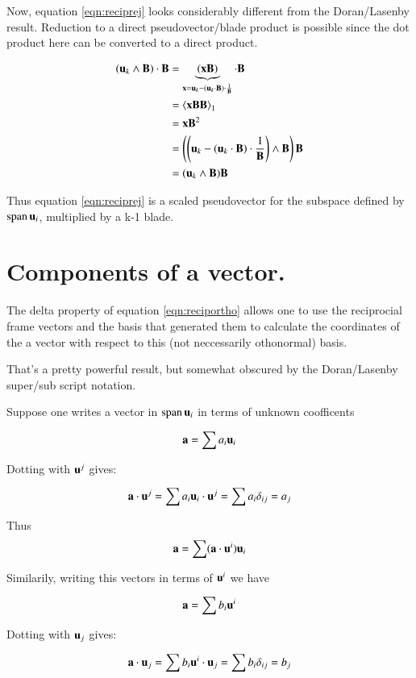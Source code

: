 \documentclass{article}      %
\newcommand{\gpgradeone}[1] {{\left\langle{{#1}}\right\rangle}_{1}}
\begin{document}
Now, 
equation \ref{eqn:reciprej}
looks considerably different from the Doran/Lasenby result.
Reduction to a direct pseudovector/blade product is possible since the
dot product here can be converted to a direct product.

\begin{align*}
(\Bu_k \wedge \BB) \cdot \BB
&= 
\underbrace{(\Bx \BB)}_{\Bx = \Bu_k - (\Bu_k \cdot \BB) \cdot \inv{\BB}}
\cdot \BB \\
&= \gpgradeone{
\Bx\BB \BB
} \\
&= \Bx \BB^2 \\
&= \left(\left(\Bu_k - (\Bu_k \cdot \BB) \cdot \inv{\BB}\right) \wedge \BB\right) \BB \\
&= (\Bu_k \wedge \BB) \BB \\
\end{align*}

Thus equation \ref{eqn:reciprej} is a scaled pseudovector for the subspace
defined by $\operatorname{span} {\mathbf{u}_i}$, multiplied by a k-1 blade.

\section{ Components of a vector. }

The delta property of 
equation \ref{eqn:reciportho} allows one to use the reciprocial frame
vectors and the basis that generated them to calculate the coordinates
of the a vector with respect to this (not neccessarily othonormal) basis.

That's a pretty powerful result, but somewhat obscured by the Doran/Lasenby
super/sub script notation.

Suppose one writes a vector in $\operatorname{span}{\mathbf{u}_i}$ in terms of unknown coofficents 

\[
\mathbf{a} = \sum a_i \mathbf{u}_i
\]

Dotting with $\mathbf{u}^j$ gives:

\[
\mathbf{a} \cdot \mathbf{u}^j 
= \sum a_i \mathbf{u}_i \cdot \mathbf{u}^j
= \sum a_i \delta_{ij}
= a_j
\]

Thus
\begin{equation}\label{eqn:nonrecipcomponents}
\mathbf{a} = \sum (\mathbf{a} \cdot \mathbf{u}^i) \mathbf{u}_i
\end{equation}

Similarily, writing this vectors in terms of $\mathbf{u}^i$ we have

\[
\mathbf{a} = \sum b_i \mathbf{u}^i
\]

Dotting with $\mathbf{u}_j$ gives:

\[
\mathbf{a} \cdot \mathbf{u}_j 
= \sum b_i \mathbf{u}^i \cdot \mathbf{u}_j
= \sum b_i \delta_{ij}
= b_j
\]
\end{document}
